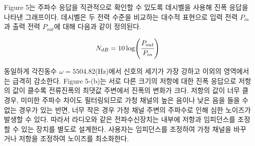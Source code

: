 \documentclass{article}
\begin{document}
Figure 5는 주파수 응답을 직관적으로 확인할 수 있도록 데시벨을 사용해 진폭 응답을 나타낸 그래프이다. 데시벨은 두 전력 수준을 비교하는 대수적 표현으로 입력 전력 $P_{in}$과 출력 전력 $P_{out}$에 대해 다음과 같이 정의된다.

\begin{equation}
    N_{dB}=10\log(\cfrac{P_{out}}{P_{in}})
\end{equation}

동일하게 각진동수  $\omega=5504.82$(Hz)에서 신호의 세기가 가장 강하고 이외의 영역에서는 급격히 감소한다. Figure 5-(b)는 서로 다른 크기의 저항에 대한 진폭 응답으로 저항의 값이 클수록 전류진폭의 최댓값 주변에서 진폭의 변화가 크다. 저항의 값이 너무 클 경우, 미미한 주파수 차이도 필터링되므로 가청 채널의 높은 음이나 낮은 음을 들을 수 없는 경우가 있는 반면, 너무 작은 경우 가청 채널 주변의 주파수로 인해 심한 노이즈가 발생할 수 있다. 따라서 라디오와 같은 전파수신장치는 내부에 저항과 임피던스를 조정할 수 있는 장치를 별도로 설계한다. 사용자는 임피던스를 조정하여 가청 채널을 바꾸거나 저항을 조정하여 노이즈를 최소화한다.
\end{document}
